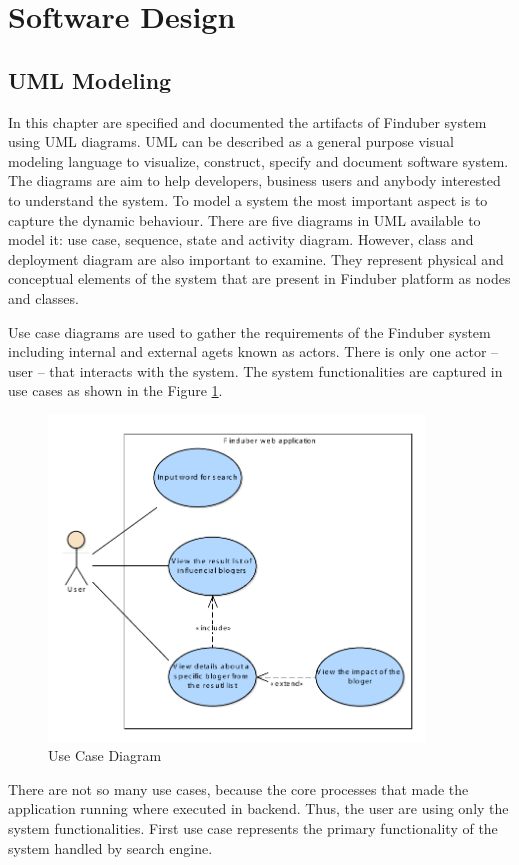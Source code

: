 \section{Software Design}
\subsection{UML Modeling}

In this chapter are specified and documented the artifacts of Finduber system using UML diagrams. UML can be described as a general purpose visual modeling language to visualize, construct, specify and document software system. The diagrams are aim to help developers, business users and anybody interested to understand the system. To model a system the most important aspect is to capture the dynamic behaviour. There are five diagrams in UML available to model it: use case, sequence, state and activity diagram. However, class and deployment diagram are also important to examine. They represent physical and conceptual elements of the system that are present in Finduber platform as nodes and classes.

Use case diagrams are used to gather the requirements of the Finduber system including internal and external agets known as actors. There is only one actor -- user -- that interacts with the system. The system functionalities are captured in use cases as shown in the Figure \ref{usecase_uml}.

\begin{figure}[!ht]
\centering
\includegraphics[width=10cm]{UseCase.pdf}
\caption{Use Case Diagram}\label{usecase_uml}
\end{figure}

There are not so many use cases, because the core processes that made the application running where executed in backend. Thus, the user are using only the system functionalities. First use case represents the primary functionality of the system handled by search engine. 

